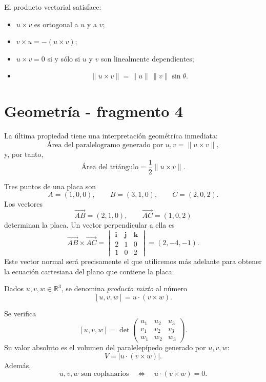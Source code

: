 El producto vectorial satisface:
\begin{itemize}
\item $u\times v$ es ortogonal a $u$ y a $v$;
\item $v\times u=-(u\times v)$;
\item $u\times v=0$ si y sólo si $u$ y $v$ son linealmente dependientes;
\item
\[
\|u\times v\|=\|u\|\,\|v\|\sin\theta.
\]
\end{itemize}


\section{Geometría - fragmento 4}
La última propiedad tiene una interpretación geométrica inmediata:
\[
\text{Área del paralelogramo generado por }u,v
=\|u\times v\|,
\]
y, por tanto,
\[
\text{Área del triángulo}
=\frac12\|u\times v\|.
\]

\begin{example}
Tres puntos de una placa son
\[
A=(1,0,0),\qquad B=(3,1,0),\qquad C=(2,0,2).
\]
Los vectores
\[
\overrightarrow{AB}=(2,1,0),
\qquad
\overrightarrow{AC}=(1,0,2)
\]
determinan la placa. Un vector perpendicular a ella es
\[
\overrightarrow{AB}\times\overrightarrow{AC}
=
\begin{vmatrix}
\mathbf i&\mathbf j&\mathbf k\\
2&1&0\\
1&0&2
\end{vmatrix}
=(2,-4,-1).
\]
Este vector normal será precisamente el que utilicemos más adelante para obtener la ecuación cartesiana del plano que contiene la placa.
\end{example}

\begin{definition}
Dados $u,v,w\in\mathbb{R}^3$, se denomina \emph{producto mixto} al número
\[
[u,v,w]=u\cdot(v\times w).
\]
\end{definition}

Se verifica
\[
[u,v,w]
=
\det
\begin{pmatrix}
u_1&u_2&u_3\\
v_1&v_2&v_3\\
w_1&w_2&w_3
\end{pmatrix}.
\]
Su valor absoluto es el volumen del paralelepípedo generado por $u,v,w$:
\[
V=|u\cdot(v\times w)|.
\]
Además,
\[
u,v,w\text{ son coplanarios}
\quad\Longleftrightarrow\quad
u\cdot(v\times w)=0.
\]


